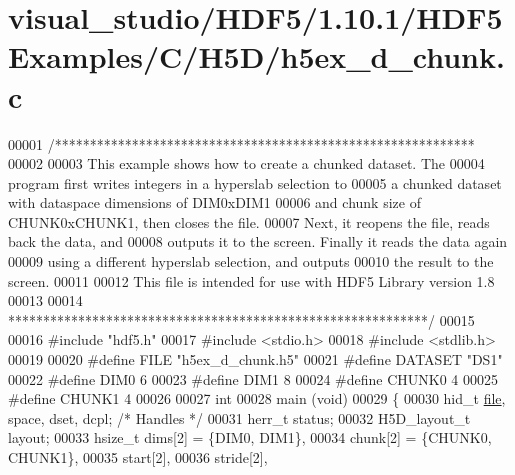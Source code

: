 \hypertarget{visual__studio_2_h_d_f5_21_810_81_2_h_d_f5_examples_2_c_2_h5_d_2h5ex__d__chunk_8c_source}{}\section{visual\+\_\+studio/\+H\+D\+F5/1.10.1/\+H\+D\+F5\+Examples/\+C/\+H5\+D/h5ex\+\_\+d\+\_\+chunk.c}
\label{visual__studio_2_h_d_f5_21_810_81_2_h_d_f5_examples_2_c_2_h5_d_2h5ex__d__chunk_8c_source}

\begin{DoxyCode}
00001 \textcolor{comment}{/************************************************************}
00002 \textcolor{comment}{}
00003 \textcolor{comment}{  This example shows how to create a chunked dataset.  The}
00004 \textcolor{comment}{  program first writes integers in a hyperslab selection to}
00005 \textcolor{comment}{  a chunked dataset with dataspace dimensions of DIM0xDIM1}
00006 \textcolor{comment}{  and chunk size of CHUNK0xCHUNK1, then closes the file.}
00007 \textcolor{comment}{  Next, it reopens the file, reads back the data, and}
00008 \textcolor{comment}{  outputs it to the screen.  Finally it reads the data again}
00009 \textcolor{comment}{  using a different hyperslab selection, and outputs}
00010 \textcolor{comment}{  the result to the screen.}
00011 \textcolor{comment}{}
00012 \textcolor{comment}{  This file is intended for use with HDF5 Library version 1.8}
00013 \textcolor{comment}{}
00014 \textcolor{comment}{ ************************************************************/}
00015 
00016 \textcolor{preprocessor}{#include "hdf5.h"}
00017 \textcolor{preprocessor}{#include <stdio.h>}
00018 \textcolor{preprocessor}{#include <stdlib.h>}
00019 
00020 \textcolor{preprocessor}{#define FILE            "h5ex\_d\_chunk.h5"}
00021 \textcolor{preprocessor}{#define DATASET         "DS1"}
00022 \textcolor{preprocessor}{#define DIM0            6}
00023 \textcolor{preprocessor}{#define DIM1            8}
00024 \textcolor{preprocessor}{#define CHUNK0          4}
00025 \textcolor{preprocessor}{#define CHUNK1          4}
00026 
00027 \textcolor{keywordtype}{int}
00028 main (\textcolor{keywordtype}{void})
00029 \{
00030     hid\_t           \hyperlink{structfile}{file}, space, dset, dcpl;    \textcolor{comment}{/* Handles */}
00031     herr\_t          status;
00032     H5D\_layout\_t    layout;
00033     hsize\_t         dims[2] = \{DIM0, DIM1\},
00034                     chunk[2] = \{CHUNK0, CHUNK1\},
00035                     start[2],
00036                     stride[2],

\end{DoxyCode}
